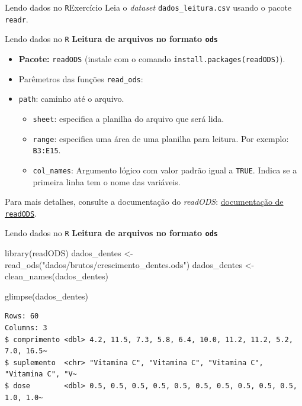 \documentclass[
  10pt,
  ignorenonframetext,
]{beamer}
\newenvironment{Shaded}{\begin{snugshade}}{\end{snugshade}}
\newcommand{\FunctionTok}[1]{\textcolor[rgb]{0.28,0.35,0.67}{#1}}
\newcommand{\NormalTok}[1]{\textcolor[rgb]{0.00,0.23,0.31}{#1}}
\newcommand{\OtherTok}[1]{\textcolor[rgb]{0.00,0.23,0.31}{#1}}
\newcommand{\StringTok}[1]{\textcolor[rgb]{0.13,0.47,0.30}{#1}}
\providecommand{\tightlist}{%
  \setlength{\itemsep}{0pt}\setlength{\parskip}{0pt}}\usepackage{longtable,booktabs,array}
\begin{document}
\begin{frame}[fragile]{Lendo dados no \texttt{R}\newline Exercício}
\protect\hypertarget{lendo-dados-no-rexercuxedcio-1}{}
Leia o \emph{dataset} \texttt{dados\_leitura.csv} usando o pacote
\texttt{readr}.
\end{frame}

\begin{frame}[fragile]{Lendo dados no \texttt{R}}
\protect\hypertarget{lendo-dados-no-r-4}{}
\textbf{Leitura de arquivos no formato \texttt{ods}}

\begin{itemize}
\tightlist
\item
  \textbf{Pacote:} \texttt{readODS} (instale com o comando
  \texttt{install.packages(\textquotesingle{}readODS\textquotesingle{})}).
\item
  Parêmetros das funções \texttt{read\_ods}:
\item
  \texttt{path}: caminho até o arquivo.

  \begin{itemize}
  \tightlist
  \item
    \texttt{sheet}: especifica a planilha do arquivo que será lida.
  \item
    \texttt{range}: especifica uma área de uma planilha para leitura.
    Por exemplo: \texttt{B3:E15}.
  \item
    \texttt{col\_names}: Argumento lógico com valor padrão igual a
    \texttt{TRUE}. Indica se a primeira linha tem o nome das variáveis.
  \end{itemize}
\end{itemize}

Para mais detalhes, consulte a documentação do \emph{readODS}:
\href{https://github.com/chainsawriot/readODS}{documentação de
\texttt{readODS}}.
\end{frame}

\begin{frame}[fragile]{Lendo dados no \texttt{R}}
\protect\hypertarget{lendo-dados-no-r-5}{}
\textbf{Leitura de arquivos no formato \texttt{ods}}

\begin{Shaded}
\begin{Highlighting}[]
\FunctionTok{library}\NormalTok{(readODS)}
\NormalTok{dados\_dentes }\OtherTok{\textless{}{-}} \FunctionTok{read\_ods}\NormalTok{(}\StringTok{"dados/brutos/crescimento\_dentes.ods"}\NormalTok{)}
\NormalTok{dados\_dentes }\OtherTok{\textless{}{-}} \FunctionTok{clean\_names}\NormalTok{(dados\_dentes)}

\FunctionTok{glimpse}\NormalTok{(dados\_dentes)}
\end{Highlighting}
\end{Shaded}

\begin{verbatim}
Rows: 60
Columns: 3
$ comprimento <dbl> 4.2, 11.5, 7.3, 5.8, 6.4, 10.0, 11.2, 11.2, 5.2, 7.0, 16.5~
$ suplemento  <chr> "Vitamina C", "Vitamina C", "Vitamina C", "Vitamina C", "V~
$ dose        <dbl> 0.5, 0.5, 0.5, 0.5, 0.5, 0.5, 0.5, 0.5, 0.5, 0.5, 1.0, 1.0~
\end{verbatim}
\end{frame}
\end{document}
